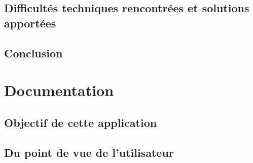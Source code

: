 \documentclass[12pt,a4paper]{report}
\begin{document}
  \subsection{Difficultés techniques rencontrées et solutions apportées}
  \label{sub:Difficultés techniques rencontrées et solutions apportées}

  \subsection{Conclusion}
  \label{sub:Conclusion}

\section{Documentation}%
\label{sec:Documentation}

  \subsection{Objectif de cette application}
  \label{sub:Objectif de cette application}

  \subsection{Du point de vue de l'utilisateur}
  \label{sub:Du point de vue de l'utilisateur}
\end{document}
